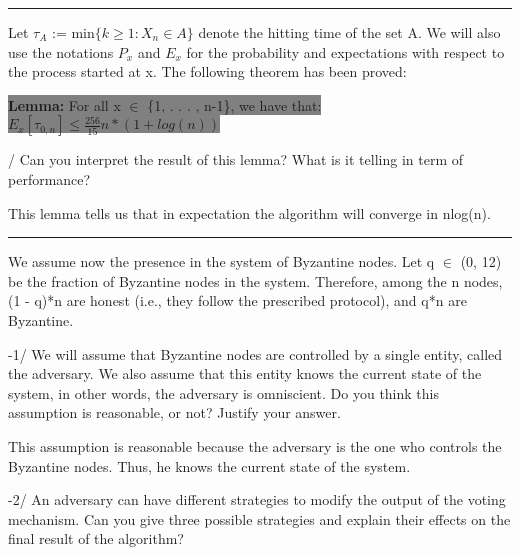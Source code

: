 \documentclass[11pt]{article}
\begin{document}
\begin{center}
    \noindent\rule{8cm}{0.4pt} 
\end{center}


\noindent Let $\tau_{A}$ := min$\{k \geq 1 : X_{n} \in A\}$ denote the hitting time of the set A. We will also use the
notations $P_{x}$ and $E_{x}$ for the probability and expectations with respect to the process started at x. The
following theorem has been proved:
\begin{center}
    \colorbox{Gray}{\textbf{Lemma:} For all x $\in$ \{1, . . . , n-1\}, we have that: $E_{x}[\tau_{0,n}] \leq \frac{256}{15}n*(1 + log(n))$}
\end{center}

\vspace{5mm}

/ Can you interpret the result of this lemma? What is it telling in term of performance?

\vspace{5mm}

\noindent This lemma tells us that in expectation the algorithm will converge in nlog(n).

\begin{center}
    \noindent\rule{8cm}{0.4pt} 
\end{center}

We assume now the presence in the system of Byzantine nodes. Let q $\in$ (0, 12) be the fraction
of Byzantine nodes in the system. Therefore, among the n nodes, (1 - q)*n are honest (i.e., they follow
the prescribed protocol), and q*n are Byzantine.

\vspace{5mm}

-1/ We will assume that Byzantine nodes are controlled by a single entity, called the adversary. We
also assume that this entity knows the current state of the system, in other words, the adversary
is omniscient. Do you think this assumption is reasonable, or not? Justify your answer. 

\vspace{5mm}

\noindent This assumption is reasonable because the adversary is the one who controls the Byzantine nodes. Thus, he knows the current state of the system.

\vspace{5mm}

-2/ An adversary can have different strategies to modify the output of the voting mechanism. Can
you give three possible strategies and explain their effects on the final result of the algorithm?
\end{document}
